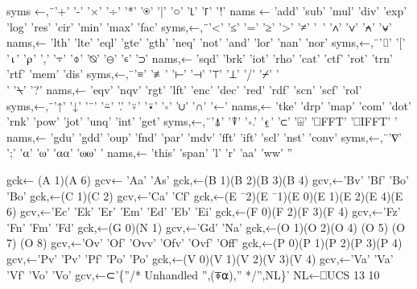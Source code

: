 \documentclass{article}%
\begin{document}
        syms ←,¨'+'           '-'            '×'            '÷'            '*'             '⍟'           '|'              '○'           '⌊'          '⌈'           '!'
        nams ←        'add'    'sub'  'mul' 'div' 'exp' 'log' 'res'    'cir'   'min'  'max' 'fac'
        syms,←,¨'<'           '≤'          '='             '≥'           '>'             '≠'           '~'              '∧'           '∨'          '⍲'           '⍱'
        nams,←        'lth'    'lte'  'eql' 'gte' 'gth' 'neq' 'not'    'and'   'lor'  'nan' 'nor'
        syms,←,¨'⌷'                 '['            '⍳'           '⍴'           ','             '⍪'           '⌽'            '⍉'           '⊖'          '∊'           '⊃'
        nams,←        'sqd'    'brk'  'iot' 'rho' 'cat' 'ctf' 'rot'    'trn'   'rtf'  'mem' 'dis'
        syms,←,¨'≡'                 '≢'          '⊢'           '⊣'           '⊤'           '⊥'           '/'              '⌿'           '\\'            '⍀'           '?'
        nams,←        'eqv'    'nqv'  'rgt' 'lft' 'enc' 'dec' 'red'    'rdf'   'scn'  'scf' 'rol'
        syms,←,¨'↑'                 '↓'          '¨'            '⍨'           '.'             '⍤'           '⍣'            '∘'           '∪'          '∩'           '←'
        nams,←        'tke'    'drp'  'map' 'com' 'dot' 'rnk' 'pow'    'jot'   'unq'  'int' 'get'
        syms,←,¨'⍋'                 '⍒'          '∘.'  '⍷'           '⊂'           '⌹'           '⎕FFT' '⎕IFFT' '%
        nams,←        'gdu'    'gdd'  'oup' 'fnd' 'par' 'mdv' 'fft'    'ift'   'scl'  'nst' 'conv'
        syms,←,¨'∇'                 ';'            '⍺'           '⍵'           '⍺⍺'        '⍵⍵'        '%
        nams,←        'this' 'span' 'l'               'r'             'aa'    'ww'    ''

        gck← (A 1)(A 6)
        gcv← 'Aa' 'As'
        gck,←(B 1)(B 2)(B 3)(B 4)
        gcv,←'Bv' 'Bf' 'Bo' 'Bo'
        gck,←(C 1)(C 2)
        gcv,←'Ca' 'Cf'
        gck,←(E ¯2)(E ¯1)(E 0)(E 1)(E 2)(E 4)(E 6)
        gcv,←'Ec'      'Ek'    'Er' 'Em' 'Ed' 'Eb' 'Ei'
        gck,←(F 0)(F 2)(F 3)(F 4)
        gcv,←'Fz' 'Fn' 'Fm' 'Fd'
        gck,←(G 0)(N 1)
        gcv,←'Gd' 'Na'
        gck,←(O 1)(O 2)(O 4) (O 5) (O 7) (O 8)
        gcv,←'Ov' 'Of' 'Ovv' 'Ofv' 'Ovf' 'Off'
        gck,←(P 0)(P 1)(P 2)(P 3)(P 4)
        gcv,←'Pv' 'Pv' 'Pf' 'Po' 'Po'
        gck,←(V 0)(V 1)(V 2)(V 3)(V 4)
        gcv,←'Va' 'Va' 'Vf' 'Vo' 'Vo'
        gcv,←⊂'\{''/* Unhandled '',(⍕⍺),'' */'',NL\}'
        NL←⎕UCS 13 10
\end{document}
